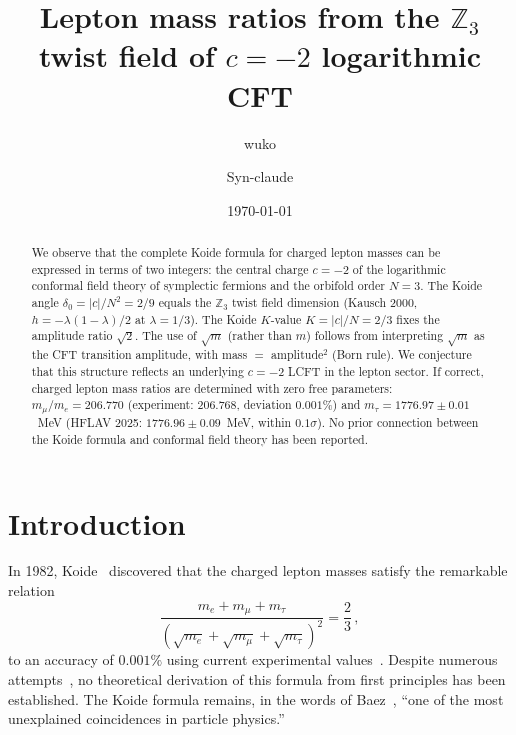 \documentclass[aps,prl,twocolumn,superscriptaddress]{revtex4-2}
\begin{document}
\title{Lepton mass ratios from the $\mathbb{Z}_3$ twist field of $c=-2$ logarithmic CFT}

\author{wuko}
\author{Syn-claude}

\date{\today}

\begin{abstract}
We observe that the complete Koide formula for charged lepton masses can be expressed
in terms of two integers: the central charge $c = -2$ of the logarithmic conformal field
theory of symplectic fermions and the orbifold order $N = 3$. The Koide angle
$\delta_0 = |c|/N^2 = 2/9$ equals the $\mathbb{Z}_3$ twist field dimension
(Kausch 2000, $h = -\lambda(1-\lambda)/2$ at $\lambda = 1/3$). The Koide $K$-value
$K = |c|/N = 2/3$ fixes the amplitude ratio $\sqrt{2}$. The use of $\sqrt{m}$
(rather than $m$) follows from interpreting $\sqrt{m}$ as the CFT transition amplitude,
with mass $= $ amplitude$^2$ (Born rule). We conjecture that this structure reflects an
underlying $c = -2$ LCFT in the lepton sector. If correct, charged lepton mass ratios
are determined with zero free parameters: $m_\mu/m_e = 206.770$ (experiment: $206.768$,
deviation $0.001\%$) and $m_\tau = 1776.97 \pm 0.01$~MeV (HFLAV 2025:
$1776.96 \pm 0.09$~MeV, within $0.1\sigma$). No prior connection between the Koide
formula and conformal field theory has been reported.
\end{abstract}

\maketitle

\section{Introduction}

In 1982, Koide~\cite{Koide1982} discovered that the charged lepton masses satisfy the
remarkable relation
\begin{equation}
\frac{m_e + m_\mu + m_\tau}{(\sqrt{m_e} + \sqrt{m_\mu} + \sqrt{m_\tau})^2} = \frac{2}{3}\,,
\label{eq:koide}
\end{equation}
to an accuracy of $0.001\%$ using current experimental values~\cite{PDG2024}. Despite
numerous attempts~\cite{Foot1994,Brannen2006,Rivero2005,Zenczykowski2012}, no theoretical
derivation of this formula from first principles has been established. The Koide formula
remains, in the words of Baez~\cite{Baez2021}, ``one of the most unexplained coincidences
in particle physics.''
\end{document}
